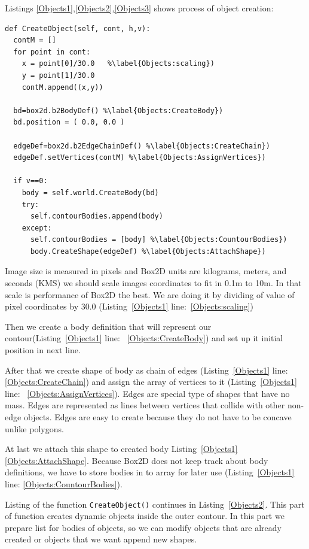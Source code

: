 \documentclass{ifacconf}
\begin{document}
Listings \ref{Objects1},\ref{Objects2},\ref{Objects3} shows process of object
creation:
\begin{lstlisting}[name=Objects,label=Objects1,caption=Creation of object from outer contour]
def CreateObject(self, cont, h,v):
  contM = []
  for point in cont:
    x = point[0]/30.0	%\label{Objects:scaling})
    y = point[1]/30.0
    contM.append((x,y))
    
  bd=box2d.b2BodyDef() %\label{Objects:CreateBody})
  bd.position = ( 0.0, 0.0 )
  
  edgeDef=box2d.b2EdgeChainDef() %\label{Objects:CreateChain})
  edgeDef.setVertices(contM) %\label{Objects:AssignVertices})

  if v==0:
    body = self.world.CreateBody(bd)
    try:
      self.contourBodies.append(body)
    except:
      self.contourBodies = [body] %\label{Objects:CountourBodies})
      body.CreateShape(edgeDef) %\label{Objects:AttachShape})
\end{lstlisting}
Image size is measured in pixels and Box2D units are kilograms, meters,
and seconds (KMS) we should scale images coordinates to fit in 0.1m to
10m. In that scale is performance of Box2D the best. We are doing it by
dividing of value of pixel coordinates by 30.0
(Listing~\ref{Objects1} line:~\ref{Objects:scaling})

Then we create a body definition that will represent our 
contour(Listing~\ref{Objects1} line:~ \ref{Objects:CreateBody}) and set up it
initial position in next line.

After that we create shape of body as chain of edges (Listing~\ref{Objects1}
line:~ \ref{Objects:CreateChain}) and assign the array of vertices to it
(Listing~\ref{Objects1} line:~ \ref{Objects:AssignVertices}). Edges are special
type of shapes that have no mass. Edges are represented as lines between
vertices that collide with other non-edge objects. Edges are easy to create
because they do not have to be concave unlike polygons.

At last we attach this shape to created body Listing~\ref{Objects1}
\ref{Objects:AttachShape}. Because Box2D does not keep track about body
definitions, we have to store bodies in to array for later use
(Listing~\ref{Objects1} line: \ref{Objects:CountourBodies}).

Listing of the function \lstinline{CreateObject()} continues in
Listing~\ref{Objects2}. This part of function creates dynamic objects inside the
outer contour. In this part we prepare list for bodies of objects, so we can
modify objects that are already created or objects that we want append new shapes.
\end{document}
